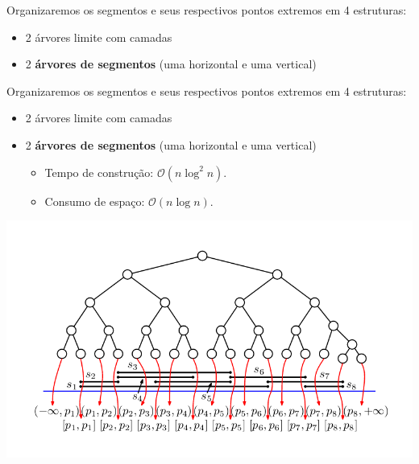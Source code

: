 \documentclass[
paper=128mm:96mm, %
fontsize=11pt, %
pagesize, %
parskip=half-, %
]{scrartcl} %
\newcommand*{\myblack}[1]{\textcolor{myblack}{#1}}
\theoremstyle{mythmstyle} %
\begin{document}
\clearpage

\begin{flushleft}
  Organizaremos os segmentos e seus respectivos pontos extremos em 4 estruturas:

  \begin{itemize}
  \item 2 árvores limite com camadas
  \item 2 \textbf{\myblack{árvores de segmentos}} (uma horizontal e uma vertical)
  \end{itemize}
\end{flushleft}
  
\clearpage


\begin{flushleft}
  Organizaremos os segmentos e seus respectivos pontos extremos em 4 estruturas:

  \begin{itemize}
  \item 2 árvores limite com camadas
  \item 2 \textbf{\myblack{árvores de segmentos}} (uma horizontal e uma vertical)
    \begin{itemize}
      \item Tempo de construção: $\mathcal{O}(n \log^2 n)$.
      \item Consumo de espaço: $\mathcal{O}(n \log n)$.
    \end{itemize}
  \end{itemize}
\end{flushleft}
  
\clearpage


\includegraphics[width=\textwidth,height=\textheight]{4}
\clearpage
\clearpage
\end{document}
